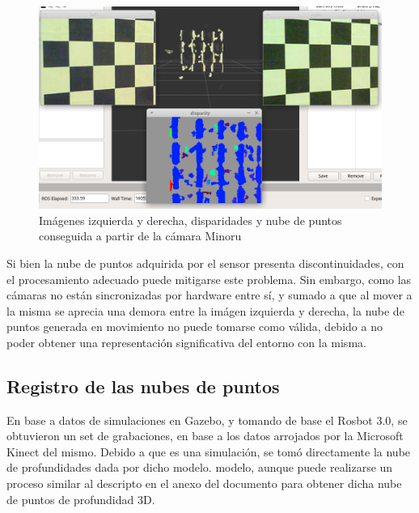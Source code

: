 \begin{figure}[!ht]
    \centering
    \includegraphics[width=\linewidth]{Img/MinoruPointCloud.png}
    \caption{Imágenes izquierda y derecha, disparidades y nube de puntos conseguida a partir de la cámara Minoru}
    \label{fig:minorupointcloud}
\end{figure}

Si bien la nube de puntos adquirida por el sensor presenta discontinuidades, con el procesamiento adecuado puede mitigarse este problema. Sin embargo, como las cámaras no están sincronizadas por hardware entre sí, y sumado a que al mover a la misma se aprecia una demora entre la imágen izquierda y derecha, la nube de puntos generada en movimiento no puede tomarse como válida, debido a no poder obtener una representación significativa del entorno con la misma.
\ifimagenes
\subsection{Registro de las nubes de puntos}
En base a datos de simulaciones en Gazebo, y tomando de base el Rosbot 3.0, se obtuvieron un set de grabaciones, en base a los datos arrojados por la Microsoft Kinect del mismo. Debido a que es una simulación, se tomó directamente la nube de profundidades dada por dicho 
    \ifimagenespaper
modelo.
    \else
modelo, aunque puede realizarse un proceso similar al descripto en el anexo del documento para obtener dicha nube de puntos de profundidad 3D.
    \fi

